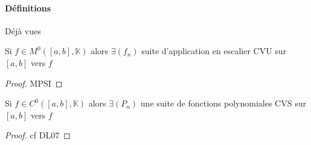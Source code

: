 \documentclass[11pt,hidelinks]{book}
\theoremstyle{mytheoremstyle}
\theoremstyle{mytheoremstyle}
\theoremstyle{mytheoremstyle}
\theoremstyle{mytheoremstyle}
\theoremstyle{mytheoremstyle}
\theoremstyle{mytheoremstyle}
\theoremstyle{mytheoremstyle}
\theoremstyle{mytheoremstyle}
\theoremstyle{myproblemstyle}
\def\mbb#1{\mathbb{#1}}
\def\bK{\mbb{K}}
\begin{document}
\paragraph{Définitions} Déjà vues
 \begin{adjustwidth}{-2em}{-1em}
    \begin{theorem}
    Si $f \in M^0([a,b],\bK)$ alors $\exists (f_n)$ suite d'application en escalier CVU sur $[a,b]$ vers $f$
    \begin{proof}
        MPSI
    \end{proof}
\end{theorem}

    \begin{theorem}
        Si $f \in C^0([a,b], \bK)$ alors $\exists (P_n)$ une suite de fonctions polynomiales CVS sur $[a,b]$ vers $f$
        \begin{proof}
            cf DL07
        \end{proof}
    \end{theorem}
\end{adjustwidth}
\end{document}
